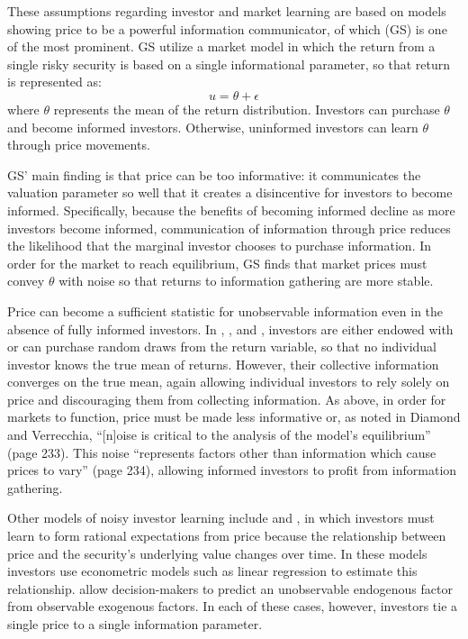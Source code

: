 \documentclass[11pt]{article}
\begin{document}
These assumptions regarding investor and market learning are based on models showing price to be a powerful information communicator, of which \citet{grossmanImpossibilityInformationallyEfficient1980} (GS) is one of the most prominent. GS utilize a market model in which the return from a single risky security is based on a single informational parameter, so that return is represented as:
\begin{equation}
u = \theta + \epsilon
\end{equation}
where \(\theta\) represents the mean of the return distribution. Investors can purchase \(\theta\) and become informed investors. Otherwise, uninformed investors can learn \(\theta\) through price movements. 

GS' main finding is that price can be too informative: it communicates the valuation parameter so well that it creates a disincentive for investors to become informed. Specifically, because the benefits of becoming informed decline as more investors become informed, communication of information through price reduces the likelihood that the marginal investor chooses to purchase information. In order for the market to reach equilibrium, GS finds that market prices must convey \(\theta\) with noise so that returns to information gathering are more stable.

Price can become a sufficient statistic for unobservable information even in the absence of fully informed investors. In \citet{grossmanEfficiencyCompetitiveStock1976}, \citet{diamondInformationAggregationNoisy1981}, and \citet{verrecchiaConsensusBeliefsInformation1980}, investors are either endowed with or can purchase random draws from the return variable, so that no individual investor knows the true mean of returns. However, their collective information converges on the true mean, again allowing individual investors to rely solely on price and discouraging them from collecting information. As above, in order for markets to function, price must be made less informative or, as noted in Diamond and Verrecchia, ``[n]oise is critical to the analysis of the model’s equilibrium'' (page 233). This noise ``represents factors other than information which cause prices to vary'' (page 234), allowing informed investors to profit from information gathering.

Other models of noisy investor learning include \citet{brayLearningEstimationStability1982} and \citet{brayRationalExpectationsEquilibria1986}, in which investors must learn to form rational expectations from price because the relationship between price and the security's underlying value changes over time. In these models investors use econometric models such as linear regression to estimate this relationship. \citet{fourgeaudLearningProceduresConvergence1986} allow decision-makers to predict an unobservable endogenous factor from observable exogenous factors. In each of these cases, however, investors tie a single price to a single information parameter.
\end{document}
